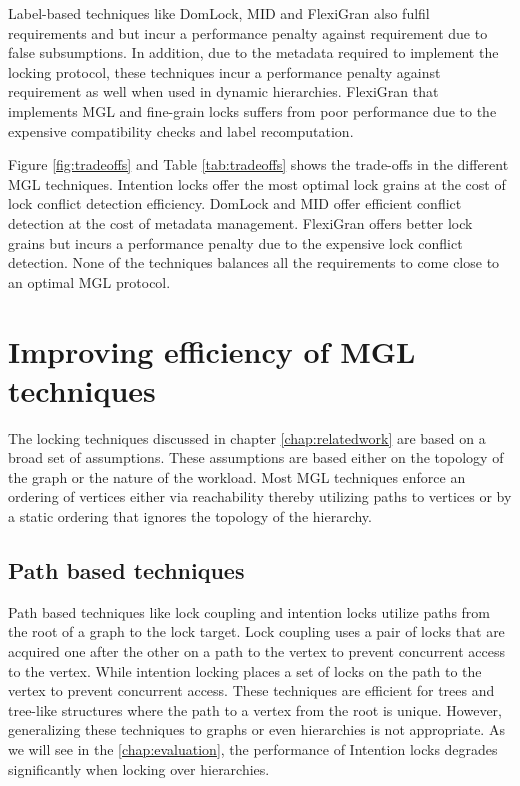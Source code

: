 Label-based techniques like DomLock, MID and FlexiGran also fulfil requirements \Ra and \Rb but incur a performance penalty against requirement \Rc due to false subsumptions. In addition, due to the metadata required to implement the locking protocol, these techniques incur a performance penalty against requirement \Rd as well when used in dynamic hierarchies. 
FlexiGran that implements MGL and fine-grain locks suffers from poor performance due to the expensive compatibility checks and label recomputation. 

Figure \ref{fig:tradeoffs} and Table \ref{tab:tradeoffs} shows the trade-offs in the different MGL techniques. Intention locks offer the most optimal lock grains at the cost of lock conflict detection efficiency. DomLock and MID offer efficient conflict detection at the cost of metadata management. FlexiGran offers better lock grains but incurs a performance penalty due to the expensive lock conflict detection. None of the techniques balances all the requirements to come close to an optimal MGL protocol.



\section{Improving efficiency of MGL techniques}

The locking techniques discussed in chapter \ref{chap:relatedwork} are based on a broad set of assumptions. These assumptions are based either on the topology of the graph or the nature of the workload. Most MGL techniques enforce an ordering of vertices either via reachability thereby utilizing paths to vertices or by a static ordering that ignores the topology of the hierarchy.

\subsection{Path based techniques}
Path based techniques like lock coupling \cite{DBLP:journals/acta/BayerS77}  and intention locks \cite{gray1975granularity} utilize paths from the root of a graph to the lock target. Lock coupling uses a pair of locks that are acquired one after the other on a path to the vertex to prevent concurrent access to the vertex. While intention locking places a set of locks on the path to the vertex to prevent concurrent access. These techniques are efficient for trees and tree-like structures where the path to a vertex from the root is unique. However, generalizing these techniques to graphs or even hierarchies is not appropriate. As we will see in the \ref{chap:evaluation}, the performance of Intention locks degrades significantly when locking over hierarchies.


